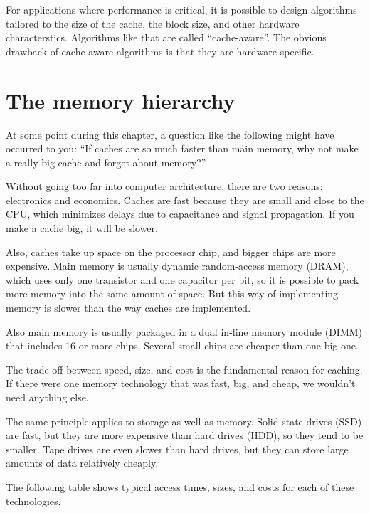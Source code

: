 \documentclass[12pt]{book}
\begin{document}
For applications where performance is critical, it is possible
to design algorithms tailored to the size of the cache, the block size,
and other hardware characterstics.  Algorithms like that are
called ``cache-aware''.  The obvious drawback of cache-aware
algorithms is that they are hardware-specific.


\section{The memory hierarchy}

At some point during this chapter, a question like the following
might have occurred to you: ``If caches are so much faster than
main memory, why not make a really big cache and forget about
memory?''

Without going too far into computer architecture, there are two
reasons: electronics and economics.  Caches are fast because they are
small and close to the CPU, which minimizes delays due to capacitance
and signal propagation.  If you make a cache big, it will be slower.

Also, caches take up space on the processor chip, and bigger chips are
more expensive.  Main memory is usually dynamic random-access memory
(DRAM), which uses only one transistor and one capacitor per bit, so
it is possible to pack more memory into the same amount of space.  But
this way of implementing memory is slower than the way caches are
implemented.
 
Also main memory is usually packaged in a dual in-line memory module
(DIMM) that includes 16 or more chips.  Several small chips are cheaper
than one big one.

The trade-off between speed, size, and cost is the fundamental reason
for caching.  If there were one memory technology that was fast,
big, and cheap, we wouldn't need anything else.

The same principle applies to storage as well as memory.  Solid state drives (SSD) are fast, but they are more expensive than hard drives (HDD), so they tend to be smaller.  Tape drives are even slower than hard
drives, but they can store large amounts of data relatively
cheaply.

The following table shows typical access times, sizes, and 
costs for each of these technologies.  
\end{document}
